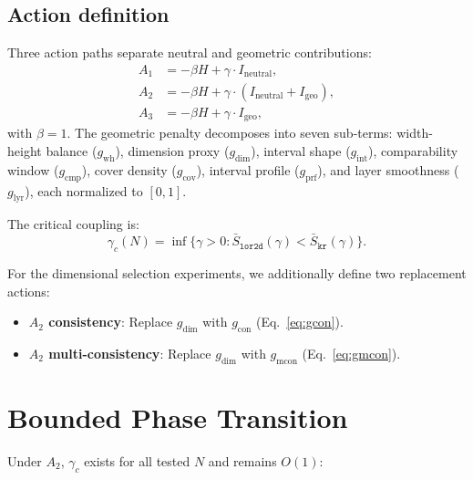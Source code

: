 \documentclass[12pt,a4paper]{article}
\begin{document}
\subsection{Action definition}
\label{sec:action}

Three action paths separate neutral and geometric contributions:
\begin{align}
    A_1 &= -\beta H + \gamma \cdot I_{\text{neutral}}, \label{eq:A1} \\
    A_2 &= -\beta H + \gamma \cdot (I_{\text{neutral}} + I_{\text{geo}}),
    \label{eq:A2} \\
    A_3 &= -\beta H + \gamma \cdot I_{\text{geo}}, \label{eq:A3}
\end{align}
with $\beta = 1$. The geometric penalty decomposes into seven sub-terms:
width-height balance ($g_{\text{wh}}$), dimension proxy ($g_{\text{dim}}$),
interval shape ($g_{\text{int}}$), comparability window ($g_{\text{cmp}}$),
cover density ($g_{\text{cov}}$), interval profile ($g_{\text{prf}}$), and
layer smoothness ($g_{\text{lyr}}$), each normalized to $[0,1]$.

The critical coupling is:
\begin{equation}
    \gamma_c(N) = \inf\bigl\{\gamma > 0 :
    \bar{S}_{\texttt{lor2d}}(\gamma) < \bar{S}_{\texttt{kr}}(\gamma)\bigr\}.
    \label{eq:gamma_c}
\end{equation}

For the dimensional selection experiments, we additionally define two
replacement actions:
\begin{itemize}[nosep]
\item \textbf{$A_2$ consistency}: Replace $g_{\text{dim}}$ with
$g_{\text{con}}$ (Eq.~\ref{eq:gcon}).
\item \textbf{$A_2$ multi-consistency}: Replace $g_{\text{dim}}$ with
$g_{\text{mcon}}$ (Eq.~\ref{eq:gmcon}).
\end{itemize}

\section{Bounded Phase Transition}
\label{sec:bounded}

Under $A_2$, $\gamma_c$ exists for all tested $N$ and remains $O(1)$:
\end{document}
